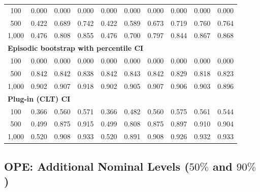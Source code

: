 \documentclass{article}
\numberwithin{equation}{section}
\begin{document}
\begin{table}[ht]
\begin{tabular}{c|ccc|cccccc}
100
& 0.000 & 0.000 & 0.000
& 0.000 & 0.000 & 0.000 & 0.000 & 0.000 & 0.000 \\
500
& 0.422 & 0.689 & 0.742
& 0.422 & 0.589 & 0.673 & 0.719 & \cellcolor{covheat!5!white}0.760 & \cellcolor{covheat!7!white}0.764 \\
1{,}000
& 0.476 & \cellcolor{covheat!29!white}0.808 & \cellcolor{covheat!52!white}0.855
& 0.476 & 0.700 & \cellcolor{covheat!24!white}0.797 & \cellcolor{covheat!47!white}0.844 & \cellcolor{covheat!59!white}0.867 & \cellcolor{covheat!59!white}0.868 \\
\hline
\multicolumn{10}{l}{\textbf{Episodic bootstrap with percentile CI}} \\ \hline
100
& 0.000 & 0.000 & 0.000
& 0.000 & 0.000 & 0.000 & 0.000 & 0.000 & 0.000 \\
500
& \cellcolor{covheat!46!white}0.842 & \cellcolor{covheat!46!white}0.842 & \cellcolor{covheat!44!white}0.838
& \cellcolor{covheat!46!white}0.842 & \cellcolor{covheat!46!white}0.843 & \cellcolor{covheat!46!white}0.842 & \cellcolor{covheat!39!white}0.829 & \cellcolor{covheat!34!white}0.818 & \cellcolor{covheat!36!white}0.823 \\
1{,}000
& \cellcolor{covheat!76!white}0.902 & \cellcolor{covheat!79!white}0.907 & \cellcolor{covheat!84!white}0.918
& \cellcolor{covheat!76!white}0.902 & \cellcolor{covheat!78!white}0.905 & \cellcolor{covheat!79!white}0.907 & \cellcolor{covheat!78!white}0.906 & \cellcolor{covheat!77!white}0.903 & \cellcolor{covheat!73!white}0.896 \\
\hline
\multicolumn{10}{l}{\textbf{Plug-in (CLT) CI}} \\ \hline
100
& 0.366 & 0.560 & 0.571
& 0.366 & 0.482 & 0.560 & 0.575 & 0.561 & 0.544 \\
500
& 0.499 & \cellcolor{covheat!63!white}0.875 & \cellcolor{covheat!83!white}0.915
& 0.499 & \cellcolor{covheat!29!white}0.808 & \cellcolor{covheat!63!white}0.875 & \cellcolor{covheat!74!white}0.897 & \cellcolor{covheat!80!white}0.910 & \cellcolor{covheat!77!white}0.904 \\
1{,}000
& 0.520 & \cellcolor{covheat!79!white}0.908 & \cellcolor{covheat!92!white}0.933
& 0.520 & \cellcolor{covheat!71!white}0.891 & \cellcolor{covheat!79!white}0.908 & \cellcolor{covheat!88!white}0.926 & \cellcolor{covheat!91!white}0.932 & \cellcolor{covheat!92!white}0.933 \\
\hline
\end{tabular}
\end{table}

\clearpage
\subsection{OPE: Additional Nominal Levels ($50\%$ and $90\%$)}
\label{app:ope-tables-multilevel}
\end{document}
